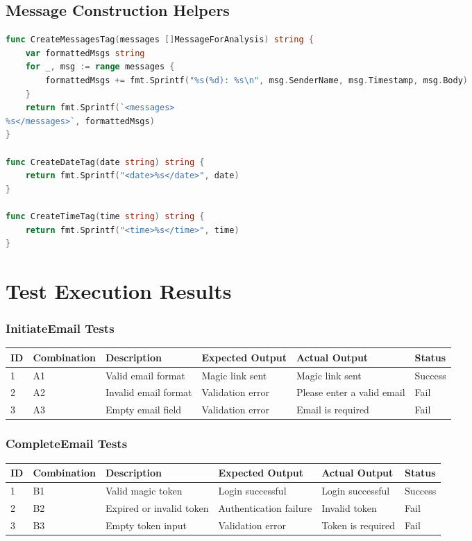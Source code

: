 \section{Message Construction Helpers}

\begin{lstlisting}[language=Go]
func CreateMessagesTag(messages []MessageForAnalysis) string {
	var formattedMsgs string
	for _, msg := range messages {
		formattedMsgs += fmt.Sprintf("%s(%d): %s\n", msg.SenderName, msg.Timestamp, msg.Body)
	}
	return fmt.Sprintf(`<messages>
%s</messages>`, formattedMsgs)
}

func CreateDateTag(date string) string {
	return fmt.Sprintf("<date>%s</date>", date)
}

func CreateTimeTag(time string) string {
	return fmt.Sprintf("<time>%s</time>", time)
}
\end{lstlisting}


\chapter{Test Execution Results}
\label{appendix:test-execution}

\subsection*{InitiateEmail Tests}

\begin{longtable}{|p{1cm}|p{2cm}|p{3cm}|p{2.5cm}|p{3cm}|p{1.5cm}|}
\hline
\textbf{ID} & \textbf{Combination} & \textbf{Description} & \textbf{Expected Output} & \textbf{Actual Output} & \textbf{Status} \\
\hline
1 & A1 & Valid email format & Magic link sent & Magic link sent & Success \\
\hline
2 & A2 & Invalid email format & Validation error & Please enter a valid email & Fail \\
\hline
3 & A3 & Empty email field & Validation error & Email is required & Fail \\
\hline
\end{longtable}

\subsection*{CompleteEmail Tests}

\begin{longtable}{|p{1cm}|p{2cm}|p{3.2cm}|p{2.5cm}|p{3cm}|p{1.5cm}|}
\hline
\textbf{ID} & \textbf{Combination} & \textbf{Description} & \textbf{Expected Output} & \textbf{Actual Output} & \textbf{Status} \\
\hline
1 & B1 & Valid magic token & Login successful & Login successful & Success \\
\hline
2 & B2 & Expired or invalid token & Authentication failure & Invalid token & Fail \\
\hline
3 & B3 & Empty token input & Validation error & Token is required & Fail \\
\hline
\end{longtable}

